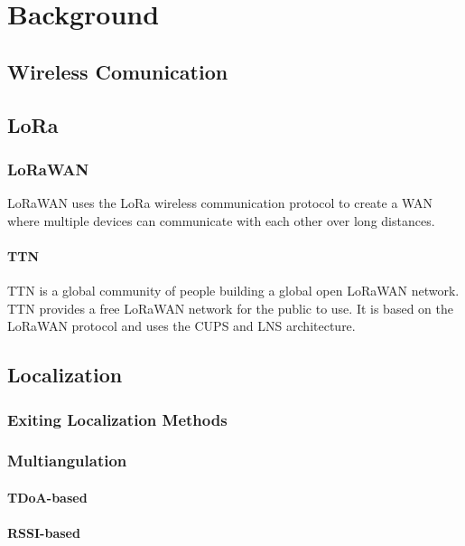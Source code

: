 \chapter{Background}

\section{Wireless Comunication}
\section{\ac{LoRa}}

\subsection{\ac{LoRaWAN}}

\ac{LoRaWAN} uses the LoRa wireless communication protocol to create a \ac{WAN} where multiple devices can communicate with each other over long distances.

\subsubsection{\ac{TTN}}

\ac{TTN} is a global community of people building a global open \ac{LoRaWAN} network. \ac{TTN} provides a free \ac{LoRaWAN} network for the public to use. It is based on the \ac{LoRaWAN} protocol and uses the \ac{CUPS} and \ac{LNS} architecture.


\section{Localization}

\subsection{Exiting Localization Methods}

\subsection{Multiangulation}

\subsubsection{\ac{TDoA}-based}

\subsubsection{\ac{RSSI}-based}

